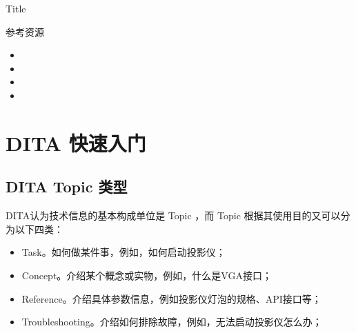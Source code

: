 \documentclass[letterpaper,10pt,english]{sphinxmanual}
\begin{document}
\begin{sphinxVerbatim}[commandchars=\\\{\}]
  Title
\end{sphinxVerbatim}

\begin{sphinxVerbatim}[commandchars=\\\{\}]
\end{sphinxVerbatim}

\sphinxAtStartPar
参考资源
\begin{itemize}
\item {} 
\sphinxAtStartPar
{}

\item {} 
\sphinxAtStartPar
{}

\item {} 
\sphinxAtStartPar
{}

\item {} 
\sphinxAtStartPar
{}

\end{itemize}

\sphinxstepscope


\chapter{DITA 快速入门}
\label{\detokenize{dita/dita-quick-demo:dita}}\label{\detokenize{dita/dita-quick-demo::doc}}

\section{DITA Topic 类型}
\label{\detokenize{dita/dita-quick-demo:dita-topic}}
\sphinxAtStartPar
DITA认为技术信息的基本构成单位是 Topic ，而 Topic 根据其使用目的又可以分为以下四类：
\begin{itemize}
\item {} 
\sphinxAtStartPar
Task。如何做某件事，例如，如何启动投影仪；

\item {} 
\sphinxAtStartPar
Concept。介绍某个概念或实物，例如，什么是VGA接口；

\item {} 
\sphinxAtStartPar
Reference。介绍具体参数信息，例如投影仪灯泡的规格、API接口等；

\item {} 
\sphinxAtStartPar
Troubleshooting。介绍如何排除故障，例如，无法启动投影仪怎么办；

\end{itemize}
\end{document}
